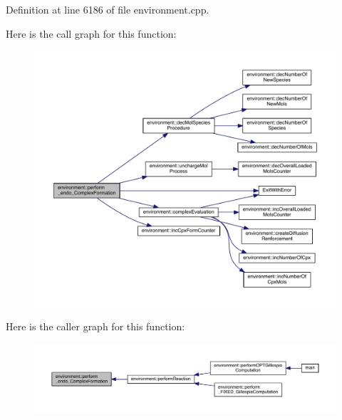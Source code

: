 Definition at line 6186 of file environment.\-cpp.



Here is the call graph for this function\-:\nopagebreak
\begin{figure}[H]
\begin{center}
\leavevmode
\includegraphics[width=350pt]{a00014_ae942db2453c56b60250a5d43452b91a5_cgraph}
\end{center}
\end{figure}




Here is the caller graph for this function\-:\nopagebreak
\begin{figure}[H]
\begin{center}
\leavevmode
\includegraphics[width=350pt]{a00014_ae942db2453c56b60250a5d43452b91a5_icgraph}
\end{center}
\end{figure}


